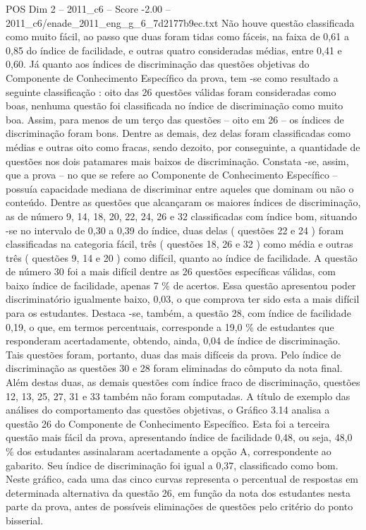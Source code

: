 \begin{textsample}{POS Dim 2 – 2011\_c6 – Score -2.00 – 2011\_c6/enade\_2011\_eng\_g\_6\_7d2177b9ec.txt}
Não houve questão classificada como muito fácil, ao passo que duas foram tidas como fáceis, na faixa de 0,61 a 0,85 do índice de facilidade, e outras quatro consideradas médias, entre 0,41 e 0,60.
Já quanto aos índices de discriminação das questões objetivas do Componente de Conhecimento Específico da prova, tem -se como resultado a seguinte classificação : oito das 26 questões válidas foram consideradas como boas, nenhuma questão foi classificada no índice de discriminação como muito boa.
Assim, para menos de um terço das questões – oito em 26 – os índices de discriminação foram bons.
Dentre as demais, dez delas foram classificadas como médias e outras oito como fracas, sendo dezoito, por conseguinte, a quantidade de questões nos dois patamares mais baixos de discriminação.
Constata -se, assim, que a prova – no que se refere ao Componente de Conhecimento Específico – possuía capacidade mediana de discriminar entre aqueles que dominam ou não o conteúdo.
Dentre as questões que alcançaram os maiores índices de discriminação, as de número 9, 14, 18, 20, 22, 24, 26 e 32 classificadas com índice bom, situando -se no intervalo de 0,30 a 0,39 do índice, duas delas ( questões 22 e 24 ) foram classificadas na categoria fácil, três ( questões 18, 26 e 32 ) como média e outras três ( questões 9, 14 e 20 ) como difícil, quanto ao índice de facilidade.
A questão de número 30 foi a mais difícil dentre as 26 questões específicas válidas, com baixo índice de facilidade, apenas 7 \% de acertos.
Essa questão apresentou poder discriminatório igualmente baixo, 0,03, o que comprova ter sido esta a mais difícil para os estudantes.
Destaca -se, também, a questão 28, com índice de facilidade 0,19, o que, em termos percentuais, corresponde a 19,0 \% de estudantes que responderam acertadamente, obtendo, ainda, 0,04 de índice de discriminação.
Tais questões foram, portanto, duas das mais difíceis da prova.
Pelo índice de discriminação as questões 30 e 28 foram eliminadas do cômputo da nota final.
Além destas duas, as demais questões com índice fraco de discriminação, questões 12, 13, 25, 27, 31 e 33 também não foram computadas.
A título de exemplo das análises do comportamento das questões objetivas, o Gráfico 3.14 analisa a questão 26 do Componente de Conhecimento Específico.
Esta foi a terceira questão mais fácil da prova, apresentando índice de facilidade 0,48, ou seja, 48,0 \% dos estudantes assinalaram acertadamente a opção A, correspondente ao gabarito.
Seu índice de discriminação foi igual a 0,37, classificado como bom.
Neste gráfico, cada uma das cinco curvas representa o percentual de respostas em determinada alternativa da questão 26, em função da nota dos estudantes nesta parte da prova, antes de possíveis eliminações de questões pelo critério do ponto bisserial.

\end{textsample}
